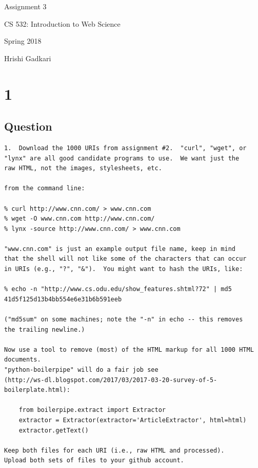 \documentclass[letterpaper,11pt]{article}
\begin{document}
\begin{titlepage}

\begin{center}

\Huge{Assignment 3}

\Large{CS 532:  Introduction to Web Science}

\Large{Spring 2018}

\Large{Hrishi Gadkari}



\end{center}

\end{titlepage}

\newpage


\section*{1}


\subsection*{Question}

\begin{verbatim}
1.  Download the 1000 URIs from assignment #2.  "curl", "wget", or
"lynx" are all good candidate programs to use.  We want just the
raw HTML, not the images, stylesheets, etc.

from the command line:

% curl http://www.cnn.com/ > www.cnn.com
% wget -O www.cnn.com http://www.cnn.com/
% lynx -source http://www.cnn.com/ > www.cnn.com

"www.cnn.com" is just an example output file name, keep in mind
that the shell will not like some of the characters that can occur
in URIs (e.g., "?", "&").  You might want to hash the URIs, like:

% echo -n "http://www.cs.odu.edu/show_features.shtml?72" | md5
41d5f125d13b4bb554e6e31b6b591eeb

("md5sum" on some machines; note the "-n" in echo -- this removes
the trailing newline.) 

Now use a tool to remove (most) of the HTML markup for all 1000 HTML documents.
"python-boilerpipe" will do a fair job see 
(http://ws-dl.blogspot.com/2017/03/2017-03-20-survey-of-5-boilerplate.html):

	from boilerpipe.extract import Extractor
	extractor = Extractor(extractor='ArticleExtractor', html=html)
	extractor.getText()

Keep both files for each URI (i.e., raw HTML and processed). 
Upload both sets of files to your github account.
\end{verbatim}
\end{document}
